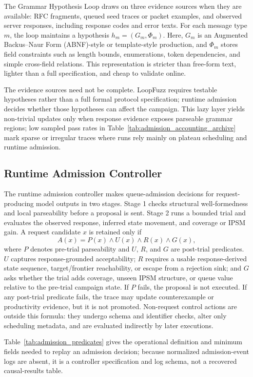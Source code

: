 \documentclass[final,5p,times,number]{elsarticle}
\begin{document}
The Grammar Hypothesis Loop draws on three evidence sources when they are available: RFC fragments, queued seed traces or packet examples, and observed server responses, including response codes and error texts. For each message type $m$, the loop maintains a hypothesis $h_m=(G_m,\Phi_m)$. Here, $G_m$ is an Augmented Backus--Naur Form (ABNF)-style or template-style production, and $\Phi_m$ stores field constraints such as length bounds, enumerations, token dependencies, and simple cross-field relations. This representation is stricter than free-form text, lighter than a full specification, and cheap to validate online.

The evidence sources need not be complete. LoopFuzz requires testable hypotheses rather than a full formal protocol specification; runtime admission decides whether those hypotheses can affect the campaign. This lazy layer yields non-trivial updates only when response evidence exposes parseable grammar regions; low sampled pass rates in Table~\ref{tab:admission_accounting_archive} mark sparse or irregular traces where runs rely mainly on plateau scheduling and runtime admission.

\subsection{Runtime Admission Controller}
The runtime admission controller makes queue-admission decisions for request-producing model outputs in two stages. Stage 1 checks structural well-formedness and local parseability before a proposal is sent. Stage 2 runs a bounded trial and evaluates the observed response, inferred state movement, and coverage or IPSM gain. A request candidate $x$ is retained only if
\[
A(x)=P(x) \land U(x) \land R(x) \land G(x),
\]
where $P$ denotes pre-trial parseability and $U$, $R$, and $G$ are post-trial predicates. $U$ captures response-grounded acceptability; $R$ requires a usable response-derived state sequence, target/frontier reachability, or escape from a rejection sink; and $G$ asks whether the trial adds coverage, unseen IPSM structure, or queue value relative to the pre-trial campaign state. If $P$ fails, the proposal is not executed. If any post-trial predicate fails, the trace may update counterexample or productivity evidence, but it is not promoted. Non-request control actions are outside this formula: they undergo schema and identifier checks, alter only scheduling metadata, and are evaluated indirectly by later executions.

Table~\ref{tab:admission_predicates} gives the operational definition and minimum fields needed to replay an admission decision; because normalized admission-event logs are absent, it is a controller specification and log schema, not a recovered causal-results table.
\end{document}
